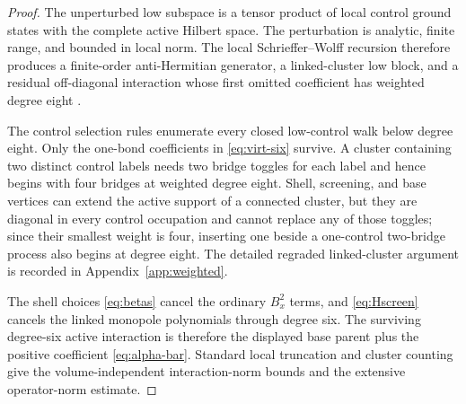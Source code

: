 \documentclass[11pt]{article}
\theoremstyle{definition}
\theoremstyle{remark}
\begin{document}
\begin{proof}
The unperturbed low subspace is a tensor product of local control ground states with the complete active Hilbert space.  The perturbation is analytic, finite range, and bounded in local norm.  The local Schrieffer--Wolff recursion therefore produces a finite-order anti-Hermitian generator, a linked-cluster low block, and a residual off-diagonal interaction whose first omitted coefficient has weighted degree eight \cite{Bravyi2011}.

The control selection rules enumerate every closed low-control walk below degree eight.  Only the one-bond coefficients in \eqref{eq:virt-six} survive.  A cluster containing two distinct control labels needs two bridge toggles for each label and hence begins with four bridges at weighted degree eight.  Shell, screening, and base vertices can extend the active support of a connected cluster, but they are diagonal in every control occupation and cannot replace any of those toggles; since their smallest weight is four, inserting one beside a one-control two-bridge process also begins at degree eight.  The detailed regraded linked-cluster argument is recorded in Appendix~\ref{app:weighted}.

The shell choices \eqref{eq:betas} cancel the ordinary $B_x^2$ terms, and \eqref{eq:Hscreen} cancels the linked monopole polynomials through degree six.  The surviving degree-six active interaction is therefore the displayed base parent plus the positive coefficient \eqref{eq:alpha-bar}.  Standard local truncation and cluster counting give the volume-independent interaction-norm bounds and the extensive operator-norm estimate.
\end{proof}
\end{document}
